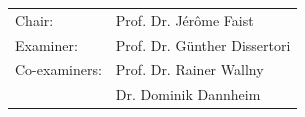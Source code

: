 \documentclass[hyperref={colorlinks=true,pdfpagelabels=false,linkcolor=black}, xcolor=dvipsnames,10pt]{beamer}
\begin{document}
{\begin{frame}[plain]
\begin{columns}
\begin{columns}
      \end{columns}
      \scriptsize{
        \begin{tabular}{l l}
          Chair: & Prof. Dr. J\'{e}r\^{o}me Faist \\
          Examiner: & Prof. Dr. G\"{u}nther Dissertori\\
          Co-examiners: &Prof. Dr. Rainer Wallny \\
                 &  Dr. Dominik Dannheim \\
        \end{tabular}
      }
    \end{columns}

  \end{frame}
}


\end{document}
